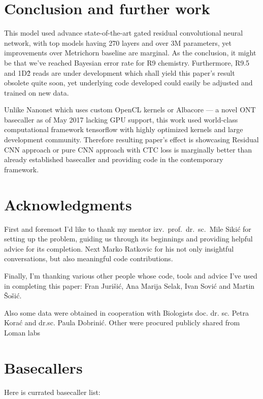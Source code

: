 \documentclass[runningheads,a4paper]{llncs}
\begin{document}
\section{Conclusion and further work}

This model used advance state-of-the-art gated residual convolutional neural network, with top models having 270 layers and over 3M parameters, yet improvements over Metrichorn baseline are marginal. As the conclusion, it might be that we've reached Bayesian error rate for R9 chemistry. Furthermore, R9.5 and 1D\^2 reads are under development which shall yield this paper's result obsolete quite soon, yet underlying code developed could easily be adjusted and trained on new data.

Unlike Nanonet which uses custom OpenCL kernels or Albacore --- a novel ONT basecaller as of May 2017 lacking GPU support, this work used world-class computational framework tensorflow with highly optimized kernels and large development community. Therefore resulting paper's effect is showcasing Residual CNN approach or pure CNN approach with CTC loss is marginally better than already established basecaller and providing code in the contemporary framework.

\section{Acknowledgments}

First and foremost I'd like to thank my mentor izv.~prof.~dr.~sc.~Mile Sikić for setting up the problem, guiding us through its beginnings and providing helpful advice for its completion. Next Marko Ratkovic for his not only insightful conversations, but also meaningful code contributions.

Finally, I'm thanking various other people whose code, tools and advice I've used in completing this paper: Fran Jurišić, Ana Marija Selak, Ivan Sović and Martin Šošić.

Also some data were obtained in cooperation with Biologists doc. dr. sc. Petra Korać and dr.sc. Paula Dobrinić. Other were procured publicly shared from Loman labs~\cite{loman1-100k}

% 


\appendix
\section{Basecallers}\label{app:basecallers}
Here is currated basecaller list:
\end{document}
